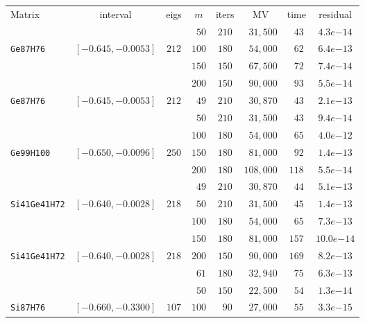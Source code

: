 \begin{tabular}{l|c|c|c|c|c|c|c}
\hline
\multirow{2}{*}{Matrix} & \multirow{2}{*}{interval} & \multirow{2}{*}{eigs} & \multirow{2}{*}{$m$} & \multirow{2}{*}{iters} & \multirow{2}{*}{MV} & \multirow{2}{*}{time} & \multirow{2}{*}{residual} \\
 & & & & & & & \\\hline
\hline
 & & & $\phantom{0}50$ & $210$ & $\phantom{0}31,500$ & $\phantom{0}43$ & $4.3e{-14}$ \\
\verb|Ge87H76| & $[-0.645,-0.0053]$ & $212$ & $100$ & $180$ & $\phantom{0}54,000$ & $\phantom{0}62$ & $6.4e{-13}$ \\
 & & & $150$ & $150$ & $\phantom{0}67,500$ & $\phantom{0}72$ & $7.4e{-14}$ \\\hline
 & & & $200$ & $150$ & $\phantom{0}90,000$ & $\phantom{0}93$ & $5.5e{-14}$ \\
\verb|Ge87H76| & $[-0.645,-0.0053]$ & $212$ & $\phantom{0}49$ & $210$ & $\phantom{0}30,870$ & $\phantom{0}43$ & $2.1e{-13}$ \\
 & & & $\phantom{0}50$ & $210$ & $\phantom{0}31,500$ & $\phantom{0}43$ & $9.4e{-14}$ \\\hline
 & & & $100$ & $180$ & $\phantom{0}54,000$ & $\phantom{0}65$ & $4.0e{-12}$ \\
\verb|Ge99H100| & $[-0.650,-0.0096]$ & $250$ & $150$ & $180$ & $\phantom{0}81,000$ & $\phantom{0}92$ & $1.4e{-13}$ \\
 & & & $200$ & $180$ & $108,000$ & $118$ & $5.5e{-14}$ \\\hline
 & & & $\phantom{0}49$ & $210$ & $\phantom{0}30,870$ & $\phantom{0}44$ & $5.1e{-13}$ \\
\verb|Si41Ge41H72| & $[-0.640,-0.0028]$ & $218$ & $\phantom{0}50$ & $210$ & $\phantom{0}31,500$ & $\phantom{0}45$ & $1.4e{-13}$ \\
 & & & $100$ & $180$ & $\phantom{0}54,000$ & $\phantom{0}65$ & $7.3e{-13}$ \\\hline
 & & & $150$ & $180$ & $\phantom{0}81,000$ & $157$ & $10.0e{-14}$ \\
\verb|Si41Ge41H72| & $[-0.640,-0.0028]$ & $218$ & $200$ & $150$ & $\phantom{0}90,000$ & $169$ & $8.2e{-13}$ \\
 & & & $\phantom{0}61$ & $180$ & $\phantom{0}32,940$ & $\phantom{0}75$ & $6.3e{-13}$ \\\hline
 & & & $\phantom{0}50$ & $150$ & $\phantom{0}22,500$ & $\phantom{0}54$ & $1.3e{-14}$ \\
\verb|Si87H76| & $[-0.660,-0.3300]$ & $107$ & $100$ & $\phantom{0}90$ & $\phantom{0}27,000$ & $\phantom{0}55$ & $3.3e{-15}$ \\

\end{tabular}
